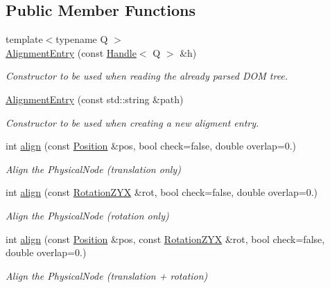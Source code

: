 \subsection*{Public Member Functions}
\begin{DoxyCompactItemize}
\item 
{\footnotesize template$<$typename Q $>$ }\\\hyperlink{class_d_d4hep_1_1_geometry_1_1_alignment_entry_ad4ffe383c34e94bd490725fedbc4607c}{Alignment\+Entry} (const \hyperlink{class_d_d4hep_1_1_handle}{Handle}$<$ Q $>$ \&h)
\begin{DoxyCompactList}\small\item\em Constructor to be used when reading the already parsed D\+OM tree. \end{DoxyCompactList}\item 
\hyperlink{class_d_d4hep_1_1_geometry_1_1_alignment_entry_aea78cab8d4289851bfa9118625e24185}{Alignment\+Entry} (const std\+::string \&path)
\begin{DoxyCompactList}\small\item\em Constructor to be used when creating a new aligment entry. \end{DoxyCompactList}\item 
int \hyperlink{class_d_d4hep_1_1_geometry_1_1_alignment_entry_aea159236f1998b0b4ed084d9b33d9179}{align} (const \hyperlink{namespace_d_d4hep_1_1_geometry_a55083902099d03506c6db01b80404900}{Position} \&pos, bool check=false, double overlap=0.)
\begin{DoxyCompactList}\small\item\em Align the Physical\+Node (translation only) \end{DoxyCompactList}\item 
int \hyperlink{class_d_d4hep_1_1_geometry_1_1_alignment_entry_af2e1c4e25b729271106064e912de2645}{align} (const \hyperlink{namespace_d_d4hep_1_1_geometry_a24667b2b9c3cec3d5239828db4d52189}{Rotation\+Z\+YX} \&rot, bool check=false, double overlap=0.)
\begin{DoxyCompactList}\small\item\em Align the Physical\+Node (rotation only) \end{DoxyCompactList}\item 
int \hyperlink{class_d_d4hep_1_1_geometry_1_1_alignment_entry_ad66e1d47dd542160eea927f23b76018a}{align} (const \hyperlink{namespace_d_d4hep_1_1_geometry_a55083902099d03506c6db01b80404900}{Position} \&pos, const \hyperlink{namespace_d_d4hep_1_1_geometry_a24667b2b9c3cec3d5239828db4d52189}{Rotation\+Z\+YX} \&rot, bool check=false, double overlap=0.)
\begin{DoxyCompactList}\small\item\em Align the Physical\+Node (translation + rotation) \end{DoxyCompactList}\end{DoxyCompactItemize}

